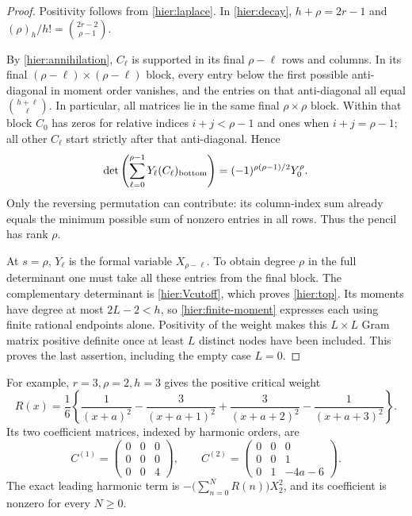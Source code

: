 \begin{proof}
Positivity follows from \eqref{hier:laplace}.  In
\eqref{hier:decay}, $h+\rho=2r-1$ and
$(\rho)_h/h!=\binom{2r-2}{\rho-1}$.

By \eqref{hier:annihilation}, $C_\ell$ is supported in its final
$\rho-\ell$ rows and columns.  In its final
$(\rho-\ell)\times(\rho-\ell)$ block, every entry below the first
possible anti-diagonal in moment order vanishes, and the entries on
that anti-diagonal all equal
$\binom{h+\ell}{\ell}$.  In particular, all matrices lie in the
same final $\rho\times\rho$ block.  Within that block $C_0$ has
zeros for relative indices $i+j<\rho-1$ and ones when
$i+j=\rho-1$; all other $C_\ell$ start strictly after that
anti-diagonal.  Hence
\begin{equation}\label{hier:block-det}
 \det\left(\sum_{\ell=0}^{\rho-1}Y_\ell
                  (C_\ell)_{\rm bottom}\right)
     =(-1)^{\rho(\rho-1)/2}Y_0^\rho.
\end{equation}
Only the reversing permutation can contribute: its column-index sum
already equals the minimum possible sum of nonzero entries in all
rows.  Thus the pencil has rank $\rho$.

At $s=\rho$, $Y_\ell$ is the formal variable $X_{\rho-\ell}$.
To obtain degree $\rho$ in the full determinant one must take all
these entries from the final block.  The complementary determinant
is \eqref{hier:Vcutoff}, which proves \eqref{hier:top}.
Its moments have degree at most $2L-2<h$, so
\eqref{hier:finite-moment} expresses each using finite rational
endpoints alone.  Positivity of the weight makes this $L\times L$
Gram matrix positive definite once at least $L$ distinct nodes have
been included.  This proves the last assertion, including the empty
case $L=0$.
\end{proof}

For example, $r=3,\rho=2,h=3$ gives the positive critical weight
\[
 R(x)=\frac16\left\{\frac1{(x+a)^2}-\frac3{(x+a+1)^2}
              +\frac3{(x+a+2)^2}-\frac1{(x+a+3)^2}\right\}.
\]
Its two coefficient matrices, indexed by harmonic orders, are
\[
 C^{(1)}=\begin{pmatrix}0&0&0\\0&0&0\\0&0&4\end{pmatrix},
 \qquad
 C^{(2)}=\begin{pmatrix}0&0&0\\0&0&1\\0&1&-4a-6\end{pmatrix}.
\]
The exact leading harmonic term is
$-\bigl(\sum_{n=0}^N R(n)\bigr)X_2^2$, and its coefficient is
nonzero for every $N\ge0$.

